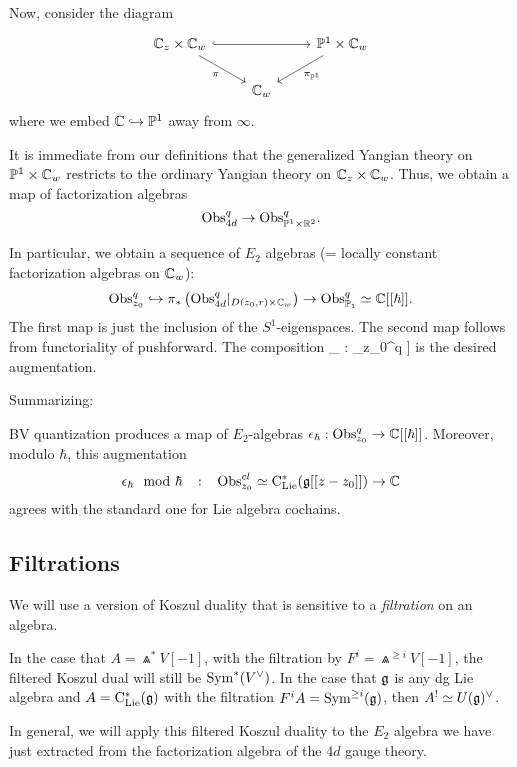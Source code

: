 \documentclass[11pt]{amsart}
\begin{document}
Now, consider the diagram
\[
\begin{tikzcd}
\CC_{z} \times \CC_w \ar[dr, "\pi"'] \ar[rr,hook] & & \PP^1 \times \CC_w \ar[dl, "\pi_{\PP^1}"] \\
& \CC_w &
\end{tikzcd} 
\]
where we embed $\mathbb C \hookrightarrow \mathbb P^1$ away from $\infty$. 

It is immediate from our definitions that the generalized Yangian theory on $\mathbb P^1 \times \mathbb C_w$ restricts to the ordinary Yangian theory on $\mathbb C_z \times \mathbb C_w$.
Thus, we obtain a map of factorization algebras
\[
{\rm Obs}^{q}_{4d} \to {\rm Obs}^{q}_{\mathbb P^1 \times \mathbb R^2} .
\]

In particular, we obtain a sequence of $E_2$ algebras (= locally constant factorization algebras on $\mathbb C_w$):
\[
{\rm Obs}_{z_0}^q \hookrightarrow \pi_*\left({\rm Obs}^{q}_{4d}|_{D(z_0,r) \times \mathbb C_w}\right) \to {\rm Obs}^q_{\mathbb P_1} \simeq \mathbb C[[\hbar]] .
\] 
The first map is just the inclusion of the $S^1$-eigenspaces. 
The second map follows from functoriality of pushforward.
The composition 
\beqn\label{aug}
\epsilon_{\hbar} : \Obs_{z_0}^q \to \CC[[\hbar]]
\eeqn
is the desired augmentation.

Summarizing:

\begin{cor}
BV quantization produces a map of $E_2$-algebras $\epsilon_{\hbar} : {\rm Obs}^q_{z_0} \to \mathbb C[[\hbar]]$. 
Moreover, modulo $\hbar$, this augmentation
\[
\epsilon_\hbar \mod \hbar \;\;\; : \;\;\; {\rm Obs}^{cl}_{z_0} \simeq {\rm C}_{{\rm Lie}}^*(\mathfrak g[[z-z_0]]) \to \mathbb C
\]
agrees with the standard one for Lie algebra cochains. 
\end{cor}

\subsection{Filtrations}

We will use a version of Koszul duality that is sensitive to a {\em filtration} on an algebra. 

In the case that $A = \Wedge^* V[-1]$, with the filtration by $F^i = \Wedge^{\geq i} V[-1]$, the filtered Koszul dual will still be ${\rm Sym}^*(V^\vee)$. 
In the case that $\mathfrak g$ is any dg Lie algebra and $A = {\rm C}_{{\rm Lie}}^*(\mathfrak g)$ with the filtration $F^i A = {\rm Sym}^{\geq i} (\mathfrak g)$, then $A^! \simeq U(\mathfrak g)^\vee$. 

In general, we will apply this filtered Koszul duality to the $E_2$ algebra we have just extracted from the factorization algebra of the $4d$ gauge theory. 
\end{document}
